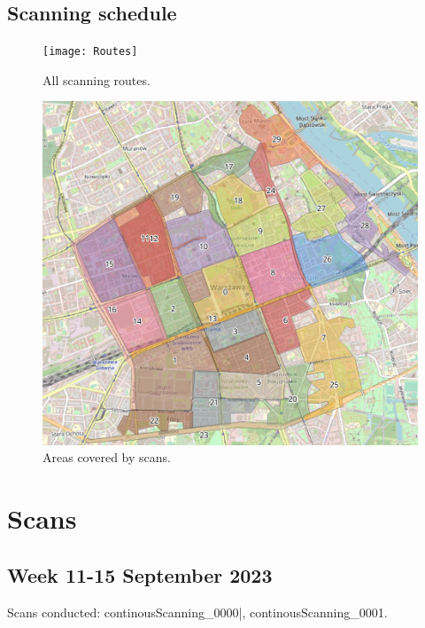 \documentclass[a4paper,12pt]{book}
\begin{document}
\section{Scanning schedule}
\begin{figure}[H]
	\centering
	\texttt{[image: Routes]}
	\caption{All scanning routes.}
\end{figure}

\begin{figure}[H]
	\centering
	\includegraphics[width=1\linewidth]{Scan_zones}
	\caption{Areas covered by scans.}
\end{figure}



\chapter{Scans}
\section{Week 11-15 September 2023}
Scans conducted: continousScanning\_0000|, continousScanning\_0001.\\
\end{document}
